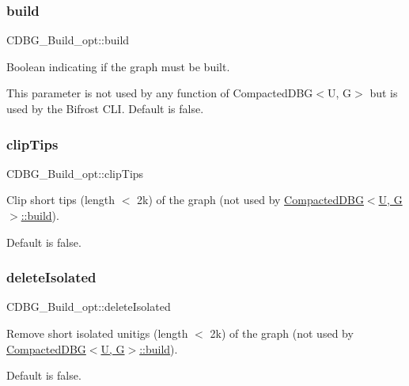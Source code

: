\subsubsection{\texorpdfstring{build}{build}}
{\footnotesize\ttfamily C\+D\+B\+G\+\_\+\+Build\+\_\+opt\+::build}



Boolean indicating if the graph must be built. 

This parameter is not used by any function of Compacted\+D\+B\+G$<$\+U, G$>$ but is used by the Bifrost C\+LI. Default is false. \mbox{\label{structCDBG__Build__opt_a7e916ec6f4674bf1239b64da22bac9ee}} 
\subsubsection{\texorpdfstring{clip\+Tips}{clipTips}}
{\footnotesize\ttfamily C\+D\+B\+G\+\_\+\+Build\+\_\+opt\+::clip\+Tips}



Clip short tips (length $<$ 2k) of the graph (not used by \hyperlink{classCompactedDBG_a6021ad2fe7b11998b886bc5fd9e1a4ba}{Compacted\+D\+B\+G$<$\+U, G$>$\+::build}). 

Default is false. \mbox{\label{structCDBG__Build__opt_ae5c727e6d5b10764d03556f570ab5f5d}} 
\subsubsection{\texorpdfstring{delete\+Isolated}{deleteIsolated}}
{\footnotesize\ttfamily C\+D\+B\+G\+\_\+\+Build\+\_\+opt\+::delete\+Isolated}



Remove short isolated unitigs (length $<$ 2k) of the graph (not used by \hyperlink{classCompactedDBG_a6021ad2fe7b11998b886bc5fd9e1a4ba}{Compacted\+D\+B\+G$<$\+U, G$>$\+::build}). 

Default is false. \mbox{\label{structCDBG__Build__opt_a121574067fffe9fa3c0c280ec633ffc3}} 
